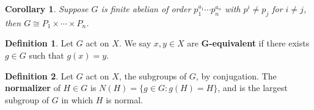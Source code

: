 \documentclass[
    parskip=half,
    toc=flat,
    toc=sectionentrydotfill,
]{scrartcl}  %
\theoremstyle{definition}
\newtheorem{definition}{Definition}[section]
\theoremstyle{plain}
\newtheorem{corollary}{Corollary}[theorem]
\theoremstyle{remark}
\begin{document}

\begin{corollary}
    Suppose $G$ is finite abelian of order $p_1^{a_1}\cdots p_n^{a_n}$ with $p^i\neq p_j$ for $i\neq j$, then
    $G\cong P_1\times\cdots\times P_n$.
\end{corollary}

\begin{definition}
    Let $G$ act on $X$.
    We say $x,y\in X$ are \textbf{G-equivalent} if there exists $g\in G$ such that $g(x)=y$.
\end{definition}

\begin{definition}
    Let $G$ act on $X$, the subgroups of $G$, by conjugation.
    The \textbf{normalizer} of $H\in G$ is $N(H)=\{g\in G:g(H)=H\}$, and is the largest subgroup of $G$ in which $H$ is
    normal.
\end{definition}
\end{document}
